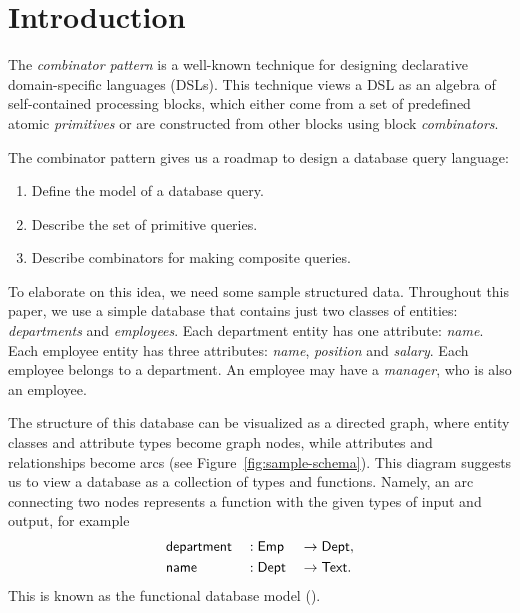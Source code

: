 
\section{Introduction}
\label{sec:introduction}

The \emph{combinator pattern} is a well-known technique for designing
declarative domain-specific languages (DSLs). This technique views a DSL as an
algebra of self-con\-tained processing blocks, which either come from a set of
predefined atomic \emph{primitives} or are constructed from other blocks using
block \emph{combinators}.

The combinator pattern gives us a roadmap to design a database query language:

\begin{enumerate}
\item
Define the model of a database query.

\item
Describe the set of primitive queries.

\item
Describe combinators for making composite queries.
\end{enumerate}

To elaborate on this idea, we need some sample structured data.  Throughout
this paper, we use a simple database that contains just two classes of
entities: \emph{departments} and \emph{employees}.  Each department entity has
one attribute: \emph{name}.  Each employee entity has three attributes:
\emph{name}, \emph{position} and \emph{salary}.  Each employee belongs to a
department.  An employee may have a \emph{manager}, who is also an employee.

The structure of this database can be visualized as a directed graph, where
entity classes and attribute types become graph nodes, while attributes and
relationships become arcs (see Figure~\ref{fig:sample-schema}).  This diagram
suggests us to view a database as a collection of types and functions.  Namely,
an arc connecting two nodes represents a function with the given types of input
and output, for example
\begin{alignat*}{3}
    & \textup{\textsf{department}} && : \textup{\textsf{Emp}} && \to \textup{\textsf{Dept}}, \\
    & \textup{\textsf{name}} && : \textup{\textsf{Dept}} && \to \textup{\textsf{Text}}.
\end{alignat*}
This is known as the functional database model (\cite{Kerschberg1976}).

